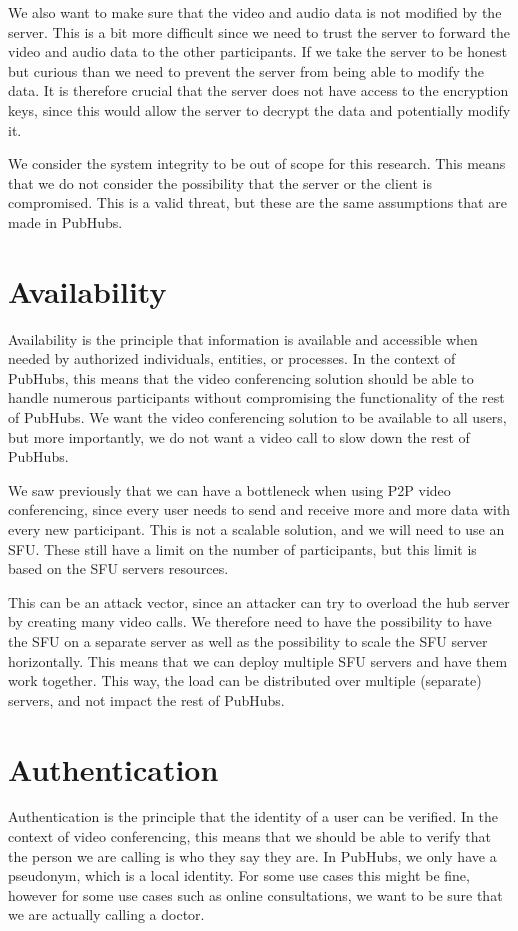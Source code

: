 \documentclass{report}
\begin{document}
We also want to make sure that the video and audio data is not modified by the server. This is a bit more difficult
since we need to trust the server to forward the video and audio data to the other participants. If we take the server
to be honest but curious than we need to prevent the server from being able to modify the data. It is therefore crucial
that the server does not have access to the encryption keys, since this would allow the server to decrypt the data and
potentially modify it.

We consider the system integrity to be out of scope for this research. This means that we do not consider the
possibility that the server or the client is compromised. This is a valid threat, but these are the same assumptions
that are made in PubHubs.

\section{Availability}
Availability is the principle that information is available and accessible when needed by authorized individuals,
entities, or processes. In the context of PubHubs, this means that the video conferencing solution should be able to
handle numerous participants without compromising the functionality of the rest of PubHubs. We want the
video conferencing solution to be available to all users, but more importantly, we do not want a video call to slow
down the rest of PubHubs.

We saw previously that we can have a bottleneck when using P2P video conferencing, since every user needs to send
and receive more and more data with every new participant. This is not a scalable solution, and we will need to use
an SFU. These still have a limit on the number of participants, but this limit is based on the SFU servers resources.

This can be an attack vector, since an attacker can try to overload the hub server by creating many video calls. We
therefore need to have the possibility to have the SFU on a separate server as well as the possibility to scale the SFU
server horizontally. This means that we can deploy multiple SFU servers and have them work together.
This way, the load can be distributed over multiple (separate) servers, and not impact the rest of PubHubs.

\section{Authentication}
Authentication is the principle that the identity of a user can be verified. In the context of video conferencing,
this means that we should be able to verify that the person we are calling is who they say they are. In PubHubs, we
only have a pseudonym, which is a local identity. For some use cases this might be fine, however for some use cases
such as online consultations, we want to be sure that we are actually calling a doctor.
\end{document}
